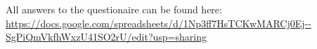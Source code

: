 All answers to the questionaire can be found here: \url{https://docs.google.com/spreadsheets/d/1Np3ff7HsTCKwMARCj0Ej--SgPiQmVkfhWxzU41SO2rU/edit?usp=sharing}